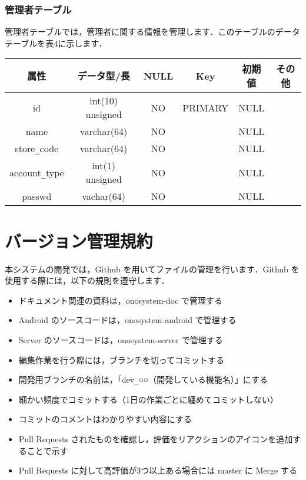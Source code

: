 \documentclass[a4j,titlepage]{jarticle}
\begin{document}
\subsubsection{管理者テーブル}
管理者テーブルでは，管理者に関する情報を管理します．このテーブルのデータテーブルを表4に示します．
\begin{table}[htb]
  \begin{center}
    \begin{tabular}{|c|c|c|c|c|c|} \hline
      属性 & データ型/長 & NULL & Key & 初期値 & その他 \\ \hline \hline
      id & int(10) unsigned & NO & PRIMARY & NULL & \\ \hline
      name & varchar(64) & NO &   & NULL & \\ \hline
      store\verb|_|code & varchar(64) & NO &   & NULL & \\ \hline
      account\verb|_|type & int(1) unsigned & NO &   & NULL & \\ \hline
      passwd & vachar(64) & NO &   & NULL & \\ \hline
    \end{tabular}
  \end{center}
\end{table}


\section{バージョン管理規約}
本システムの開発では，Github を用いてファイルの管理を行います．Github を使用する際には，以下の規則を遵守します．
\begin{itemize}
\item ドキュメント関連の資料は，onosystem-doc で管理する
\item Android のソースコードは，onosystem-android で管理する
\item Server のソースコードは，onosystem-server で管理する
\item 編集作業を行う際には，ブランチを切ってコミットする
\item 開発用ブランチの名前は，「dev\verb|_|○○（開発している機能名）」にする
\item 細かい頻度でコミットする（1日の作業ごとに纏めてコミットしない）
\item コミットのコメントはわかりやすい内容にする
\item Pull Requests されたものを確認し，評価をリアクションのアイコンを追加することで示す
\item Pull Requests に対して高評価が3つ以上ある場合には master に Merge する
\end{itemize}
\end{document}
